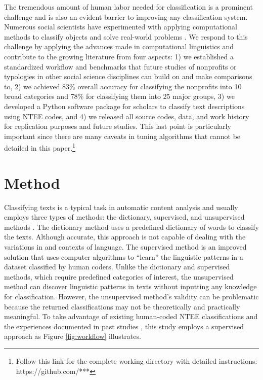 \documentclass[11pt]{article}
\begin{document}
The tremendous amount of human labor needed for classification is a prominent challenge and is also an evident barrier to improving any classification system. Numerous social scientists have experimented with applying computational methods to classify objects and solve real-world problems \parencite[e.g.,][]{BacakPrincipledMachineLearning2018,NelsonFutureCodingComparison2018,FyallNTEECodesOpportunities2018,GrimmerTextDataPromise2013}. We respond to this challenge by applying the advances made in computational linguistics and contribute to the growing literature from four aspects: 1) we established a standardized workflow and benchmarks that future studies of nonprofits or typologies in other social science disciplines can build on and make comparisons to, 2) we achieved {83\%} overall accuracy for classifying the nonprofits into 10 broad categories and {78\%} for classifying them into 25 major groups, 3) we developed a Python software package for scholars to classify text descriptions using NTEE codes, and 4) we released all source codes, data, and work history for replication purposes and future studies. This last point is particularly important since there are many caveats in tuning algorithms that cannot be detailed in this paper.\footnote{Follow this link for the complete working directory with detailed instructions: https://github.com/***}


\section{Method}

Classifying texts is a typical task in automatic content analysis and usually employs three types of methods: the dictionary, supervised, and unsupervised methods \parencite[268-269]{GrimmerTextDataPromise2013}. The dictionary method uses a predefined dictionary of words to classify the texts. Although accurate, this approach is not capable of dealing with the variations in and contexts of language. The supervised method is an improved solution that uses computer algorithms to ``learn'' the linguistic patterns in a dataset classified by human coders. Unlike the dictionary and supervised methods, which require predefined categories of interest, the unsupervised method can discover linguistic patterns in texts without inputting any knowledge for classification. However, the unsupervised method's validity can be problematic because the returned classifications may not be theoretically and practically meaningful. To take advantage of existing human-coded NTEE classifications and the experiences documented in past studies \parencite{NelsonFutureCodingComparison2018,FyallNTEECodesOpportunities2018}, this study employs a supervised approach as Figure \ref{fig:workflow} illustrates.
\end{document}
